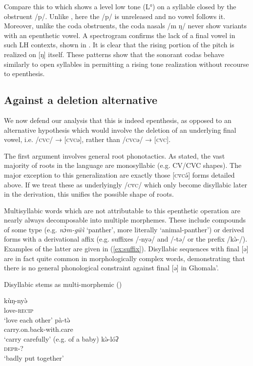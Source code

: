 \documentclass[output=paper,colorlinks,citecolor=brown,draft,draftmode]{langscibook}
\begin{document}
Compare this to  which shows a level low tone (L°) on a syllable closed by the obstruent /p/.
Unlike , here the /p/ is unreleased and no vowel follows it.
Moreover, unlike the coda obstruents, the coda nasals /m ŋ/ never show variants with an epenthetic vowel. 
A spectrogram confirms the lack of a final vowel in such LH contexts, shown in .
It is clear  that the rising portion of the pitch is realized on [ŋ] itself.
These patterns show that the sonorant codas behave similarly  to open syllables in permitting a rising tone realization without recourse to epenthesis.


\subsection{Against a deletion alternative}

We now defend our analysis that this is indeed epenthesis, as opposed to an alternative hypothesis which would involve the  deletion of an underlying final vowel, i.e.  /\textsc{cvc}/ → [\textsc{cvc}ə], rather than  /\textsc{cvc}ə/ → [\textsc{cvc}].

The first argument involves  general root phonotactics.
As stated, the vast majority of roots in the language are monosyllabic (e.g. CV/CVC shapes). 
The major exception to this generalization are exactly those [\textsc{c\`{v}c}\'ə] forms detailed above.
If we treat these  as underlyingly /\textsc{c\v{v}c}/ which only become disyllabic later in the derivation,  this unifies the possible shape of roots.

Multisyllabic words which are not attributable to this epenthetic operation are nearly always decomposable into multiple morphemes. 
These include compounds of some type (e.g. \textit{n\`ɔm-g\"{w}\`{i}} `panther', more literally `animal-panther') or derived forms with a derivational affix (e.g. suffixes /-nyə/ and /-tə/ or the prefix /k\`ə-/).
Examples of the latter are given in (\ref{ex:suffix}). 
Disyllabic sequences with final [ə] are in fact quite common in morphologically complex words, demonstrating that there is no general phonological constraint against final [ə] in Ghomala'.

\begin{exe}
	\ex Disyllabic stems as multi-morphemic (\citealt[91--92]{nissim1981}) \label{ex:suffix}
	    \begin{xlist}
		\ex 
		    k\`{u}ŋ-ny\`ə\\
		    love-\textsc{recip}\\
		    `love each other'
		\ex 
		    pà-t\`ə\\
		    carry.on.back-with.care\\
		    `carry carefully' (e.g. of a baby)
		 \ex 
		   k\`ə-l\'{o}ʔ \\
		   \textsc{depr}-? \\
		   `badly put together'
	    \end{xlist}
\end{exe}
\end{document}
